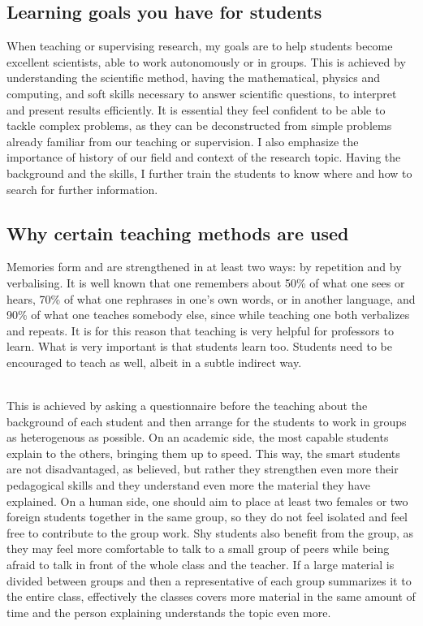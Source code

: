 \documentclass[12pt]{article} %
\begin{document}
\subsection{Learning goals you have for students}

When teaching or supervising research, my goals are to help students become excellent scientists, able to work autonomously or in groups. This is achieved by understanding the scientific method, having the mathematical, physics and computing, and soft skills necessary to answer scientific questions, to interpret and present results efficiently. It is essential they feel confident to be able to tackle complex problems, as they can be deconstructed from simple problems already familiar from our teaching or supervision. I also emphasize the importance of history of our field and context of the research topic. Having the background and the skills, I further train the students to know where and how to search for further information. 

\subsection{Why certain teaching methods are used}

Memories form and are strengthened in at least two ways: by repetition and by verbalising. It is well known that one remembers about 50\% of what one sees or hears, 70\% of what one rephrases in one's own words, or in another language, and 90\% of what one teaches somebody else, since while teaching one both verbalizes and repeats. It is for this reason that teaching is very helpful for professors to learn. What is very important is that students learn too. Students need to be encouraged to teach as well, albeit in a subtle indirect way. 

\ \\This is achieved by asking a questionnaire before the teaching about the background of each student and then arrange for the students to work in groups as heterogenous as possible. On an academic side, the most capable students explain to the others, bringing them up to speed. This way, the smart students are not disadvantaged, as believed, but rather they strengthen even more their pedagogical skills and they understand even more the material they have explained. On a human side, one should aim to place at least two females or two foreign students together in the same group, so they do not feel isolated and feel free to contribute to the group work. Shy students also benefit from the group, as they may feel more comfortable to talk to a small group of peers while being afraid to talk in front of the whole class and the teacher. If a large material is divided between groups and then a representative of each group summarizes it to the entire class, effectively the classes covers more material in the same amount of time and the person explaining understands the topic even more. 
\end{document}
